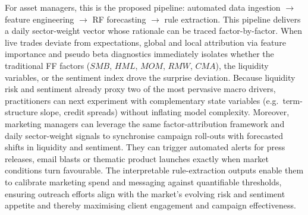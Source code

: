For asset managers, this is the proposed pipeline: automated data ingestion $\rightarrow$ feature engineering $\rightarrow$ RF forecasting $\rightarrow$ rule extraction. This pipeline delivers a daily sector-weight vector whose rationale can be traced factor-by-factor. When live trades deviate from expectations, global and local attribution via feature importance and pseudo beta diagnostics immediately isolates whether the traditional FF factors ($SMB$, $HML$, $MOM$, $RMW$, $CMA$), the liquidity variables, or the sentiment index drove the surprise deviation. Because liquidity risk and sentiment already proxy two of the most pervasive macro drivers, practitioners can next experiment with complementary state variables (e.g.\ term-structure slope, credit spreads) without inflating model complexity. Moreover, marketing managers can leverage the same factor-attribution framework and daily sector-weight signals to synchronise campaign roll-outs with forecasted shifts in liquidity and sentiment. They can trigger automated alerts for press releases, email blasts or thematic product launches exactly when market conditions turn favourable. The interpretable rule-extraction outputs enable them to calibrate marketing spend and messaging against quantifiable thresholds, ensuring outreach efforts align with the market's evolving risk and sentiment appetite and thereby maximising client engagement and campaign effectiveness.


